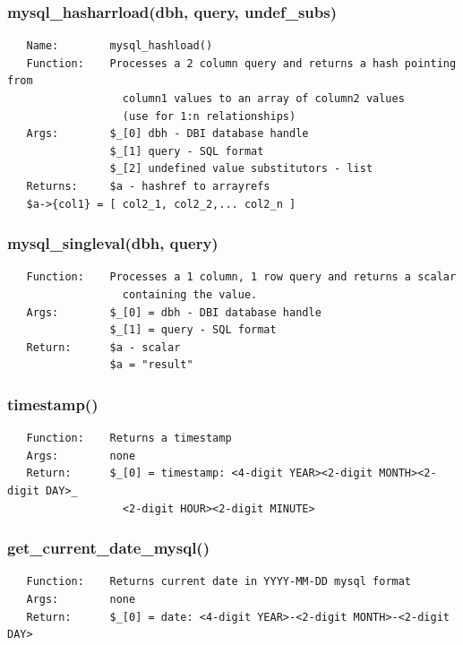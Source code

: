 \documentclass{article}
\begin{document}
\subsubsection*{mysql\_hasharrload(dbh, query, undef\_subs)\label{pibase_pm_mysql_hasharrload_dbh_query_undef_subs_}}
\begin{verbatim}
   Name:        mysql_hashload()
   Function:    Processes a 2 column query and returns a hash pointing from
                  column1 values to an array of column2 values
                  (use for 1:n relationships)
   Args:        $_[0] dbh - DBI database handle
                $_[1] query - SQL format
                $_[2] undefined value substitutors - list
   Returns:     $a - hashref to arrayrefs
   $a->{col1} = [ col2_1, col2_2,... col2_n ]
\end{verbatim}
\subsubsection*{mysql\_singleval(dbh, query)\label{pibase_pm_mysql_singleval_dbh_query_}}
\begin{verbatim}
   Function:    Processes a 1 column, 1 row query and returns a scalar
                  containing the value.
   Args:        $_[0] = dbh - DBI database handle
                $_[1] = query - SQL format
   Return:      $a - scalar
                $a = "result"
\end{verbatim}
\subsubsection*{timestamp()\label{pibase_pm_timestamp_}}
\begin{verbatim}
   Function:    Returns a timestamp
   Args:        none
   Return:      $_[0] = timestamp: <4-digit YEAR><2-digit MONTH><2-digit DAY>_
                  <2-digit HOUR><2-digit MINUTE>
\end{verbatim}
\subsubsection*{get\_current\_date\_mysql()\label{pibase_pm_get_current_date_mysql_}}
\begin{verbatim}
   Function:    Returns current date in YYYY-MM-DD mysql format
   Args:        none
   Return:      $_[0] = date: <4-digit YEAR>-<2-digit MONTH>-<2-digit DAY>
\end{verbatim}
\end{document}
